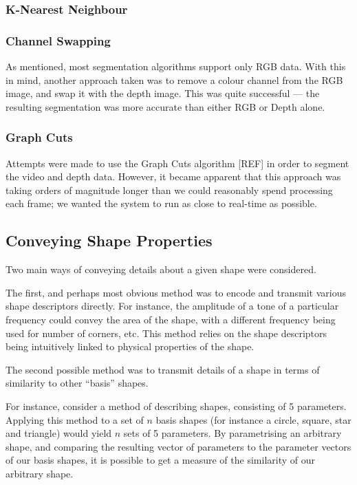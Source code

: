 \subsubsection{K-Nearest Neighbour}


\subsubsection{Channel Swapping}
As mentioned, most segmentation algorithms support only RGB data. With this in mind, another approach taken was to remove a colour channel from the RGB image, and swap it with the depth image. This was quite successful --- the resulting segmentation was more accurate than either RGB or Depth alone.

\subsubsection{Graph Cuts}
Attempts were made to use the Graph Cuts algorithm [REF] in order to segment the video and depth data. However, it became apparent that this approach was taking orders of magnitude longer than we could reasonably spend processing each frame; we wanted the system to run as close to real-time as possible.

\subsection{Conveying Shape Properties}
Two main ways of conveying details about a given shape were considered.

The first, and perhaps most obvious method was to encode and transmit various shape descriptors directly. For instance, the amplitude of a tone of a particular frequency could convey the area of the shape, with a different frequency being used for number of corners, etc. This method relies on the shape descriptors being intuitively linked to physical properties of the shape.

The second possible method was to transmit details of a shape in terms of similarity to other ``basis'' shapes.

For instance, consider a method of describing shapes, consisting of 5 parameters. Applying this method to a set of $n$ basis shapes (for instance a circle, square, star and triangle) would yield $n$ sets of 5 parameters. By parametrising an arbitrary shape, and comparing the resulting vector of parameters to the parameter vectors of our basis shapes, it is possible to get a measure of the similarity of our arbitrary shape.

